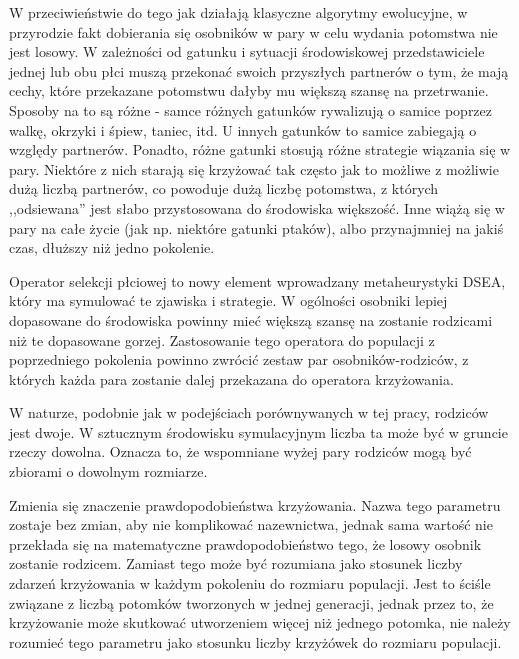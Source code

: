 \documentclass[./FM_mgr.tex]{subfiles}
\begin{document}
W przeciwieństwie do tego jak działają klasyczne algorytmy ewolucyjne, w przyrodzie fakt dobierania się osobników w pary w celu wydania potomstwa nie jest losowy.
W zależności od gatunku i sytuacji środowiskowej przedstawiciele jednej lub obu płci muszą przekonać swoich przyszłych partnerów o tym, że mają cechy, które przekazane potomstwu dałyby mu większą szansę na przetrwanie.
Sposoby na to są różne - samce różnych gatunków rywalizują o samice poprzez walkę, okrzyki i śpiew, taniec, itd. 
U innych gatunków to samice zabiegają o względy partnerów.
Ponadto, różne gatunki stosują różne strategie wiązania się w pary.
Niektóre z nich starają się krzyżować tak często jak to możliwe z możliwie dużą liczbą partnerów, co powoduje dużą liczbę potomstwa, z których ,,odsiewana'' jest słabo przystosowana do środowiska większość.
Inne wiążą się w pary na całe życie (jak np. niektóre gatunki ptaków), albo przynajmniej na jakiś czas, dłuższy niż jedno pokolenie.

Operator selekcji płciowej to nowy element wprowadzany metaheurystyki DSEA, który ma symulować te zjawiska i strategie.
W ogólności osobniki lepiej dopasowane do środowiska powinny mieć większą szansę na zostanie rodzicami niż te dopasowane gorzej.
Zastosowanie tego operatora do populacji z poprzedniego pokolenia powinno zwrócić zestaw par osobników-rodziców, z których każda para zostanie dalej przekazana do operatora krzyżowania.

W naturze, podobnie jak w podejściach porównywanych w tej pracy, rodziców jest dwoje. 
W sztucznym środowisku symulacyjnym liczba ta może być w gruncie rzeczy dowolna. 
Oznacza to, że wspomniane wyżej pary rodziców mogą być zbiorami o dowolnym rozmiarze.

Zmienia się znaczenie prawdopodobieństwa krzyżowania. 
Nazwa tego parametru zostaje bez zmian, aby nie komplikować nazewnictwa, jednak sama wartość nie przekłada się na matematyczne prawdopodobieństwo tego, że losowy osobnik zostanie rodzicem. 
Zamiast tego może być rozumiana jako stosunek liczby zdarzeń krzyżowania w każdym pokoleniu do rozmiaru populacji. 
Jest to ściśle związane z liczbą potomków tworzonych w jednej generacji, jednak przez to, że krzyżowanie może skutkować utworzeniem więcej niż jednego potomka, nie należy rozumieć tego parametru jako stosunku liczby krzyżówek do rozmiaru populacji.
\end{document}
